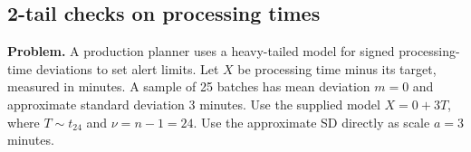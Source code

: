 \clearpage
\subsection{2-tail checks on processing times}
\label{c8-i6}
\textbf{Problem.} A production planner uses a heavy-tailed model for signed processing-time deviations to set alert limits. Let $X$ be processing time minus its target, measured in minutes. A sample of 25 batches has mean deviation $m=0$ and approximate standard deviation $3$ minutes. Use the supplied model $X=0+3T$, where $T\sim t_{24}$ and $\nu=n-1=24$. Use the approximate SD directly as scale $a=3$ minutes.
